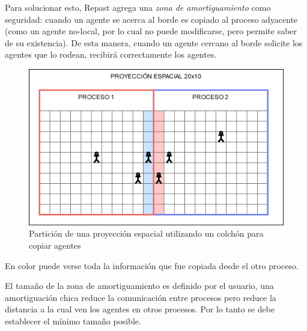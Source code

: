 Para solucionar esto, Repast agrega una \emph{zona de amortiguamiento}
como seguridad: cuando un agente se acerca al borde es copiado al
proceso adyacente (como un agente no-local, por lo cual no puede
modificarse, pero permite saber de su existencia). De esta manera,
cuando un agente cercano al borde solicite los agentes que lo rodean,
recibirá correctamente los agentes.

\begin{figure}[H]
	\centering
	\includegraphics{process_02.png}
	\caption{Partición de una proyección espacial utilizando un colchón para copiar agentes}
\end{figure}

En color puede verse toda la información que fue copiada desde el otro
proceso.

El tamaño de la zona de amortiguamiento es definido por el usuario, una
amortiguación chica reduce la comunicación entre procesos pero reduce la
distancia a la cual ven los agentes en otros procesos. Por lo tanto se
debe establecer el mínimo tamaño posible.
